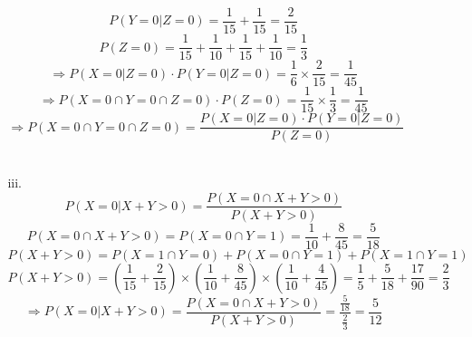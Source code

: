 \begin{enumerate}
\begin{enumerate}
\begin{enumerate}
		\[ P(Y=0|Z=0) = \frac{1}{15} + \frac{1}{15} = \frac{2}{15} \]
		\[ P(Z=0) = \frac{1}{15}  + \frac{1}{10} + \frac{1}{15} + \frac{1}{10} = \frac{1}{3} \]
		\[ \Rightarrow P(X=0|Z=0) \cdot P(Y=0|Z=0) = \frac{1}{6} \times \frac{2}{15} = \frac{1}{45} \]
		\[ \Rightarrow P(X=0 \cap Y=0 \cap Z=0) \cdot P(Z=0)  = \frac{1}{15} \times \frac{1}{3} = \frac{1}{45} \]
		\[ \Rightarrow P(X=0 \cap Y=0 \cap Z=0) = \frac{P(X=0|Z=0) \cdot P(Y=0|Z=0)}{P(Z=0)} \]\\
		\item[iii.]
		\[ P(X=0 | X+Y>0) = \frac{P(X=0 \cap X+Y>0)}{P(X+Y>0)} \]
		\[ P(X=0 \cap X+Y>0) = P(X=0 \cap Y=1) = \frac{1}{10} + \frac{8}{45} = \frac{5}{18} \]
		\[ P(X+Y>0) = P(X=1 \cap Y=0) + P(X=0 \cap Y=1) + P(X=1 \cap Y=1) \]
		\[ P(X+Y>0) = (\frac{1}{15} + \frac{2}{15}) \times (\frac{1}{10} + \frac{8}{45}) \times (\frac{1}{10} + \frac{4}{45}) = \frac{1}{5} + \frac{5}{18} + \frac{17}{90} = \frac{2}{3} \]
		\[ \Rightarrow P(X=0 | X+Y>0) = \frac{P(X=0 \cap X+Y>0)}{P(X+Y>0)} = \frac{\frac{5}{18}}{\frac{2}{3}} = \frac{5}{12} \]
		\end{enumerate}
	\end{enumerate}
\end{enumerate}




